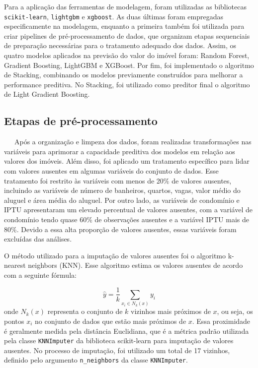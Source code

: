 \documentclass[
  12pt,
  a4paper,
]{scrreprt}
\begin{document}
\vspace{12pt}

Para a aplicação das ferramentas de modelagem, foram utilizadas as
bibliotecas \texttt{scikit-learn}, \texttt{lightgbm} e \texttt{xgboost}.
As duas últimas foram empregadas especificamente na modelagem, enquanto
a primeira também foi utilizada para criar pipelines de
pré-processamento de dados, que organizam etapas sequenciais de
preparação necessárias para o tratamento adequado dos dados. Assim, os
quatro modelos aplicados na previsão do valor do imóvel foram: Random
Forest, Gradient Boosting, LightGBM e XGBoost. Por fim, foi implementado
o algoritmo de Stacking, combinando os modelos previamente construídos
para melhorar a performance preditiva. No Stacking, foi utilizado como
preditor final o algoritmo de Light Gradient Boosting.

\subsection{Etapas de
pré-processamento}\label{etapas-de-pruxe9-processamento}

~~~Após a organização e limpeza dos dados, foram realizadas
transformações nas variáveis para aprimorar a capacidade preditiva dos
modelos em relação aos valores dos imóveis. Além disso, foi aplicado um
tratamento específico para lidar com valores ausentes em algumas
variáveis do conjunto de dados. Esse tratamento foi restrito às
variáveis com menos de 20\% de valores ausentes, incluindo as variáveis
de número de banheiros, quartos, vagas, valor médio do aluguel e área
média do aluguel. Por outro lado, as variáveis de condomínio e IPTU
apresentaram um elevado percentual de valores ausentes, com a variável
de condomínio tendo quase 60\% de observações ausentes e a variável IPTU
mais de 80\%. Devido a essa alta proporção de valores ausentes, essas
variáveis foram excluídas das análises.

\vspace{12pt}

O método utilizado para a imputação de valores ausentes foi o algoritmo
k-nearest neighbors (KNN). Esse algoritmo estima os valores ausentes de
acordo com a seguinte fórmula:

\[
\hat{y} = \frac{1}{k}\sum_{x_i \in N_k\left(x\right)}y_i
\] onde \(N_k(x)\) representa o conjunto de \(k\) vizinhos mais próximos
de \(x\), ou seja, os pontos \(x_i\) no conjunto de dados que estão mais
próximos de \(x\). Essa proximidade é geralmente medida pela distância
Euclidiana, que é a métrica padrão utilizada pela classe
\texttt{KNNImputer} da biblioteca scikit-learn para imputação de valores
ausentes. No processo de imputação, foi utilizado um total de 17
vizinhos, definido pelo argumento \texttt{n\_neighbors} da classe
\texttt{KNNImputer}.
\end{document}
